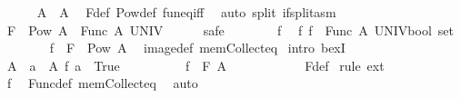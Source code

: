\begin{isabellebody}
\ \ \ \ \isamarkupfalse%
\ {\isachardoublequoteopen}A{}\ {\isacharequal}{\kern0pt}\ A{}{\isachardoublequoteclose}\ \isamarkupfalse%
\ F{\isacharunderscore}{\kern0pt}def\ Pow{\isacharunderscore}{\kern0pt}def\ fun{\isacharunderscore}{\kern0pt}eq{\isacharunderscore}{\kern0pt}iff\ \isamarkupfalse%
\ {\isacharparenleft}{\kern0pt}auto\ split{\isacharcolon}{\kern0pt}\ if{\isacharunderscore}{\kern0pt}split{\isacharunderscore}{\kern0pt}asm{\isacharparenright}{\kern0pt}\isanewline
\ \ \isamarkupfalse%
\isanewline
\ \ \ \ \isamarkupfalse%
\ {\isachardoublequoteopen}F\ {\isacharbackquote}{\kern0pt}\ Pow\ A\ {\isacharequal}{\kern0pt}\ Func\ A\ UNIV{\isachardoublequoteclose}\isanewline
\ \ \ \ \isamarkupfalse%
\ safe\isanewline
\ \ \ \ \ \ \isamarkupfalse%
\ f\ \isamarkupfalse%
\ f{\isacharcolon}{\kern0pt}\ {\isachardoublequoteopen}f\ {\isasymin}\ Func\ A\ {\isacharparenleft}{\kern0pt}UNIV{\isacharcolon}{\kern0pt}{\isacharcolon}{\kern0pt}bool\ set{\isacharparenright}{\kern0pt}{\isachardoublequoteclose}\isanewline
\ \ \ \ \ \ \isamarkupfalse%
\ {\isachardoublequoteopen}f\ {\isasymin}\ F\ {\isacharbackquote}{\kern0pt}\ Pow\ A{\isachardoublequoteclose}\ \isamarkupfalse%
\ image{\isacharunderscore}{\kern0pt}def\ mem{\isacharunderscore}{\kern0pt}Collect{\isacharunderscore}{\kern0pt}eq\ \isamarkupfalse%
{\isacharparenleft}{\kern0pt}intro\ bexI{\isacharparenright}{\kern0pt}\isanewline
\ \ \ \ \ \ \ \ \isamarkupfalse%
\ {\isacharquery}{\kern0pt}A{}\ {\isacharequal}{\kern0pt}\ {\isachardoublequoteopen}{\isacharbraceleft}{\kern0pt}a\ {\isasymin}\ A{\isachardot}{\kern0pt}\ f\ a\ {\isacharequal}{\kern0pt}\ True{\isacharbraceright}{\kern0pt}{\isachardoublequoteclose}\isanewline
\ \ \ \ \ \ \ \ \isamarkupfalse%
\ {\isachardoublequoteopen}f\ {\isacharequal}{\kern0pt}\ F\ {\isacharquery}{\kern0pt}A{}{\isachardoublequoteclose}\isanewline
\ \ \ \ \ \ \ \ \ \ \isamarkupfalse%
\ F{\isacharunderscore}{\kern0pt}def\ \isamarkupfalse%
{\isacharparenleft}{\kern0pt}rule\ ext{\isacharparenright}{\kern0pt}\isanewline
\ \ \ \ \ \ \ \ \ \ \isamarkupfalse%
\ f\ \isamarkupfalse%
\ Func{\isacharunderscore}{\kern0pt}def\ mem{\isacharunderscore}{\kern0pt}Collect{\isacharunderscore}{\kern0pt}eq\ \isamarkupfalse%
\ auto\isanewline
\ \ \ \ \ \ \isamarkupfalse%

\end{isabellebody}
